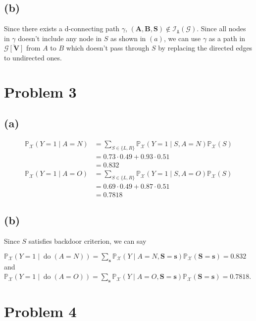 \documentclass[10pt]{article}
\begin{document}
\subsection{(b)}

Since there exists a d-connecting path $\gamma$, 
$(\mathbf{A}, \mathbf{B}, \mathbf{S}) \notin \mathcal{I}_{\Perp}(\mathcal{G})$.
Since all nodes in $\gamma$ doesn't include any node in $S$ as shown in $(a)$, we can use $\gamma$ as a path in $\overline{\mathcal{G}[\mathbf{V}]}$ from $A$ to $B$ which doesn't pass through $S$ by replacing the directed edges to undirected ones.

\section{Problem 3}

\subsection{(a)}
\begin{align*}
    \mathbb{P}_{\mathcal{X}}(Y=1 \mid A=N) &= \sum_{S \in \{L, R\}}\mathbb{P}_{\mathcal{X}}(Y=1 \mid S, A=N) \mathbb{P}_{\mathcal{X}}(S)\\   
    &= 0.73 \cdot 0.49 + 0.93 \cdot  0.51 \\
    &= 0.832\\
    \mathbb{P}_{\mathcal{X}}(Y=1 \mid A=O) &= \sum_{S \in \{L, R\}}\mathbb{P}_{\mathcal{X}}(Y=1 \mid S, A=O) \mathbb{P}_{\mathcal{X}}(S)\\   
    &= 0.69 \cdot 0.49 + 0.87 \cdot  0.51 \\
    &= 0.7818
\end{align*}

\subsection{(b)}
Since $S$ satisfies backdoor criterion,  we can say 

$\mathbb{P}_{\mathcal{X}}(Y=1 \mid \operatorname{do}(A=N)) = \sum_{\mathbf{s}} \mathbb{P}_{\mathcal{X}}(Y \mid A=N, \mathbf{S}=\mathbf{s}) \mathbb{P}_{\mathcal{X}}(\mathbf{S}=\mathbf{s})=0.832$ and 
$\mathbb{P}_{\mathcal{X}}(Y=1 \mid \operatorname{do}(A=O)) = \sum_{\mathbf{s}} \mathbb{P}_{\mathcal{X}}(Y \mid A=O, \mathbf{S}=\mathbf{s}) \mathbb{P}_{\mathcal{X}}(\mathbf{S}=\mathbf{s})=0.7818$.

\section{Problem 4}
\end{document}
